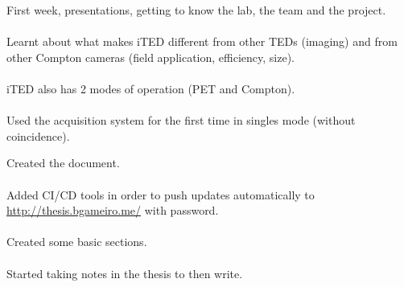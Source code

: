 \begin{minipage}[t][0.45\textheight][t]{0.97\linewidth}
\begin{minipage}[t]{0.49\textwidth}
  \end{minipage}
  \begin{minipage}[t]{0.49\textwidth}
    \begin{minipage}[t][0.22\textheight][t]{\textwidth}
        First week, presentations, getting to know the lab, the team and the project.\\~\\
        Learnt about what makes iTED different from other TEDs (imaging) and from other Compton cameras (field application, efficiency, size).\\~\\
        iTED also has 2 modes of operation (PET and Compton).\\~\\
        Used the acquisition system for the first time in singles mode (without coincidence).
    \end{minipage}
    \begin{minipage}[t][0.22\textheight][t]{\textwidth}
        Created the document.\\~\\
        Added CI/CD tools in order to push updates automatically to \url{http://thesis.bgameiro.me/} with password.\\~\\
        Created some basic sections.\\~\\
        Started taking notes in the thesis to then write.
    \end{minipage}
  \end{minipage}  
\end{minipage}

